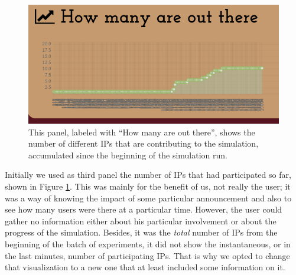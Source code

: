 \documentclass{sig-alternate}
\begin{document}
\begin{figure}[!htb]
\centering
\includegraphics[width=0.95\linewidth]{howmany.png}
\caption{This panel, labeled with ``How many are out there'', shows
  the number of different IPs that are contributing to the simulation,
  accumulated since the beginning of the simulation run.  \label{fig:howmany}}
\end{figure}
% 
Initially we used as third panel the number of IPs that had
participated so far, shown in Figure \ref{fig:howmany}. This was
mainly for the benefit of us, not really the user; it was a way of
knowing the impact of some particular announcement and also to see how
many users were there at a particular time. However, the user could
gather no information either about his particular involvement or about
the progress of the simulation. Besides, it was the {\em total} number
of IPs from the beginning of the batch of experiments, it did not show
the instantaneous, or in the last minutes, number of participating
IPs. That is why we opted to change that visualization to a new one
that at least included some information on it. 
\end{document}
